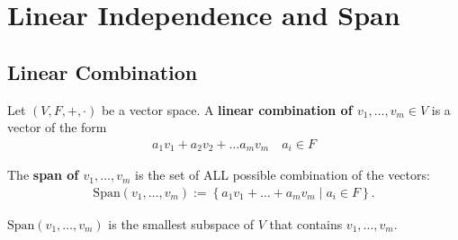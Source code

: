 \documentclass{memoir}
\begin{document}
	
\section{Linear Independence and Span}
\subsection{Linear Combination}
\begin{defn}
Let $(V,F,+,\cdot )$ be a vector space. A \textbf{linear combination of $v_1,\ldots,v_m \in V$} is a vector of the form
\begin{align*}
	a_1v_1 + a_2v_2 + \ldots a_mv_m \quad a_i \in F
\end{align*}
\end{defn}
\begin{defn}[Span]
	The \textbf{span of $v_1,\ldots,v_m$} is the set of ALL possible combination of the vectors:
	\begin{align*}
	\text{Span}(v_1,\ldots,v_m) := \left\{ a_1v_1+\ldots+a_mv_m\mid a_i \in F \right\} .
	\end{align*}
\end{defn}
\begin{prop}
	$\text{Span}(v_1,\ldots,v_m)$ is the smallest subspace of $V$ that contains $v_1,\ldots,v_m$.
\end{prop}
\end{document}
